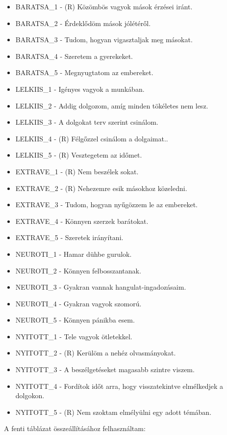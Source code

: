 \documentclass[
  letterpaper,
]{krantz}
\providecommand{\tightlist}{%
  \setlength{\itemsep}{0pt}\setlength{\parskip}{0pt}}\usepackage{longtable,booktabs,array}
\begin{document}
\begin{itemize}
\tightlist
\item
  BARATSA\_1 - (R) Közömbös vagyok mások érzései iránt.
\item
  BARATSA\_2 - Érdeklődöm mások jólétéről.
\item
  BARATSA\_3 - Tudom, hogyan vigasztaljak meg másokat.
\item
  BARATSA\_4 - Szeretem a gyerekeket.
\item
  BARATSA\_5 - Megnyugtatom az embereket.
\item
  LELKIIS\_1 - Igényes vagyok a munkában.
\item
  LELKIIS\_2 - Addig dolgozom, amíg minden tökéletes nem lesz.
\item
  LELKIIS\_3 - A dolgokat terv szerint csinálom.
\item
  LELKIIS\_4 - (R) Félgőzzel csinálom a dolgaimat..
\item
  LELKIIS\_5 - (R) Vesztegetem az időmet.
\item
  EXTRAVE\_1 - (R) Nem beszélek sokat.
\item
  EXTRAVE\_2 - (R) Nehezemre esik másokhoz közeledni.
\item
  EXTRAVE\_3 - Tudom, hogyan nyűgözzem le az embereket.
\item
  EXTRAVE\_4 - Könnyen szerzek barátokat.
\item
  EXTRAVE\_5 - Szeretek irányítani.
\item
  NEUROTI\_1 - Hamar dühbe gurulok.
\item
  NEUROTI\_2 - Könnyen felbosszantanak.
\item
  NEUROTI\_3 - Gyakran vannak hangulat-ingadozásaim.
\item
  NEUROTI\_4 - Gyakran vagyok szomorú.
\item
  NEUROTI\_5 - Könnyen pánikba esem.
\item
  NYITOTT\_1 - Tele vagyok ötletekkel.
\item
  NYITOTT\_2 - (R) Kerülöm a nehéz olvasmányokat.
\item
  NYITOTT\_3 - A beszélgetéseket magasabb szintre viszem.
\item
  NYITOTT\_4 - Fordítok időt arra, hogy visszatekintve elmélkedjek a
  dolgokon.
\item
  NYITOTT\_5 - (R) Nem szoktam elmélyülni egy adott témában.
\end{itemize}

A fenti táblázat összeállításához felhasználtam:
\end{document}
